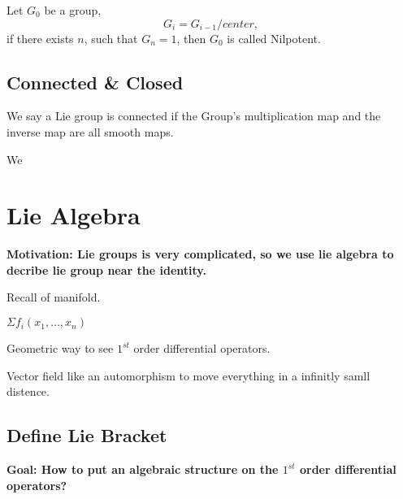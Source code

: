 \documentclass[11pt]{article}
\begin{document}
\begin{definition}
Let \(G_0\) be a group,
\[
G_i = G_{i-1}/center,
\]
if there exists \(n\), such that \(G_n = 1\), then \(G_0\) is called Nilpotent.
\end{definition}
\subsection{Connected \& Closed}
\label{sec:orgd684295}
\begin{definition}[Connected]
We say a Lie group is connected if the Group's multiplication map and the inverse map are all smooth maps.
\end{definition}

\begin{definition}[Closed]
We
\end{definition}
\section{Lie Algebra}
\label{sec:orgeda8446}
\textbf{Motivation: Lie groups is very complicated, so we use lie algebra to decribe lie group near the identity.}

Recall of manifold.

\begin{definition}
\(\Sigma f_i (x_1,\dots,x_n)\)
\end{definition}

\begin{definition}
Geometric way to see \(1^{st}\) order differential operators.
\end{definition}

\begin{definition}
Vector field like an automorphism to move everything in a infinitly samll distence.
\end{definition}
\subsection{Define Lie Bracket}
\label{sec:org690230b}
\textbf{Goal: How to put an algebraic structure on the \(1^{st}\) order differential operators?}
\end{document}
